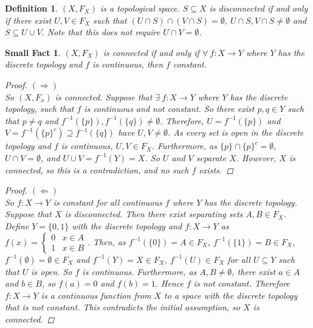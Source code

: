 \documentclass[11pt]{article}
\newtheorem{definition}{Definition}
\newtheorem{sfact}{Small Fact}
\begin{document}
\begin{definition}
$(X,F_X)$ is a topological space.  $S \subseteq X$ is disconnected if and only if there exist $U,V \in F_X$ such that $(U \cap S) \cap (V \cap S) = \emptyset$, $U \cap S, V \cap S \neq \emptyset$ and $S \subseteq U \cup V$.  Note that this does not require $U \cap V = \emptyset$.
\end{definition}
\newpage
\begin{sfact}
$(X, F_X)$ is connected if and only if $\forall \ f : X \to Y$ where $Y$ has the discrete topology and $f$ is continuous, then $f$ constant.
\begin{proof}
$(\Rightarrow)$ 
\\
So $(X,F_x)$ is connected.  Suppose that $\exists \ f : X \to Y$ where $Y$ has the discrete topology, such that $f$ is continuous and not constant.  So there exist $p,q \in Y$ such that $p \neq q$ and $f^{-1}(\{p\}), f^{-1}(\{q\}) \neq \emptyset$.  Therefore, $U = f^{-1}(\{p\})$ and $V = f^{-1}(\{p\}^c) \supseteq f^{-1}(\{q\})$ have $U,V \neq \emptyset$.  As every set is open in the discrete topology and $f$ is continuous, $U,V \in F_X$.  Furthermore, as $\{p\} \cap \{p\}^c = \emptyset$, $U \cap V = \emptyset$, and $U \cup V = f^{-1}(Y) = X$.  So $U$ and $V$ separate $X$.  However, $X$ is connected, so this is a contradiction, and no such $f$ exists.
\end{proof}
\begin{proof}
$(\Leftarrow)$
\\
So $f : X \to Y$ is constant for all continuous $f$ where $Y$ has the discrete topology.  Suppose that $X$ is disconnected.  Then there exist separating sets $A,B \in F_X$.  Define $Y = \{0,1\}$ with the discrete topology and $f : X \to Y$ as $f(x) = \left\{ \begin{array}{cc} 0 & x \in A \\ 1 & x \in B\end{array}\right.$.  Then, as $f^{-1}(\{0\}) = A \in F_X$, $f^{-1}(\{1\}) = B \in F_X$, $f^{-1}(\emptyset) = \emptyset \in F_X$ and $f^{-1}(Y) = X \in F_X$, $f^{-1}(U) \in F_X$ for all $U \subseteq Y$ such that $U$ is open.  So $f$ is continuous.  Furthermore, as $A,B \neq \emptyset$, there exist $a \in A$ and $b \in B$, so $f(a) = 0$ and $f(b) = 1$.  Hence $f$ is not constant.  Therefore $f : X \to Y$ is a continuous function from $X$ to a space with the discrete topology that is not constant.  This contradicts the initial assumption, so $X$ is connected.
\end{proof}
\end{sfact}
\end{document}
